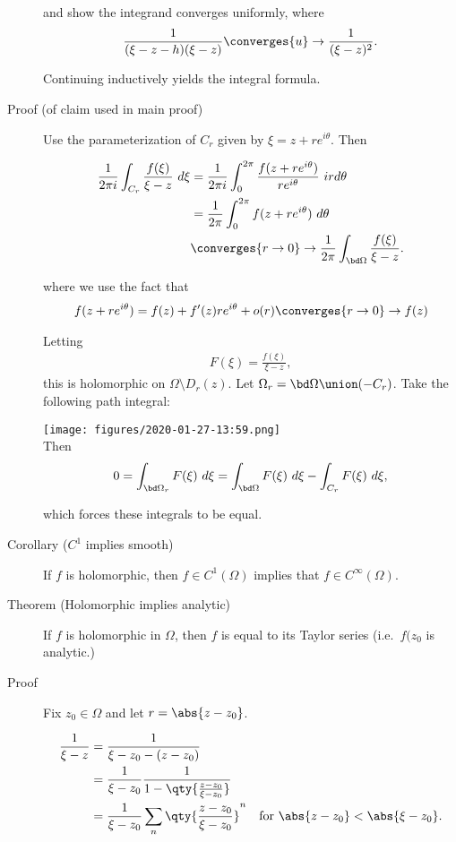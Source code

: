 \begin{description}
and show the integrand converges uniformly, where
\begin{align*}
\frac{1}{(\xi - z - h)(\xi - z)} \converges{u}\to \frac{1}{(\xi - z)^2}
.\end{align*}

Continuing inductively yields the integral formula.
\item[Proof (of claim used in main proof)]
Use the parameterization of \(C_r\) given by \(\xi = z + re^{i\theta}\).
Then

\begin{align*}
\frac{1}{2\pi i} \int_{C_r} \frac{f(\xi)}{\xi - z} ~d\xi 
&= \frac{1}{2\pi i} \int_0^{2\pi} \frac{f(z + re^{i\theta})}{re^{i\theta}} ~ird\theta \\
&= \frac{1}{2\pi} \int_0^{2\pi} f(z + re^{i\theta}) ~d\theta \\
&\converges{r \to 0}\to \frac{1}{2\pi} \int_{\bd \Omega} \frac{f(\xi)} {\xi - z}
.\end{align*}

where we use the fact that
\begin{align*}f(z + re^{i\theta}) = f(z) + f'(z)re^{i\theta} + o(r) \converges{r\to 0}\to f(z)\end{align*}

Letting
\begin{align*}F(\xi) = \frac{ f(\xi)}{\xi - z},\end{align*} this is
holomorphic on \(\Omega\setminus D_r(z)\). Let
\(\Omega_r = \bd \Omega \union (-C_r)\). Take the following path
integral:

\texttt{[image: figures/2020-01-27-13:59.png]}\\

Then \begin{align*}
0 = \int_{\bd \Omega_r} F(\xi) ~d\xi = \int_{\bd \Omega} F(\xi) ~d\xi - \int_{C_r} F(\xi) ~d\xi
,\end{align*}

which forces these integrals to be equal.
\item[Corollary (\(C^1\) implies smooth)]
If \(f\) is holomorphic, then \(f\in C^1(\Omega)\) implies that
\(f \in C^\infty(\Omega)\).
\item[Theorem (Holomorphic implies analytic)]
If \(f\) is holomorphic in \(\Omega\), then \(f\) is equal to its Taylor
series (i.e.~\(f(z_0\) is analytic.)
\item[Proof]
Fix \(z_0 \in \Omega\) and let \(r = \abs{z- z_0}\).

\begin{align*}
\frac{1}{\xi - z} 
&= \frac{1}{ \xi - z_0 - (z-z_0)  } \\
&= \frac{1}{\xi - z_0} \frac{1}{1 - \qty{ \frac{z-z_0}{\xi - z_0}   }  } \\
&= \frac{1}{\xi - z_0} \sum_n \qty{ \frac{z - z_0}{\xi - z_0}  }^n \quad\text{for } \abs{z - z_0} < \abs{\xi - z_0}
.\end{align*}


\end{description}
